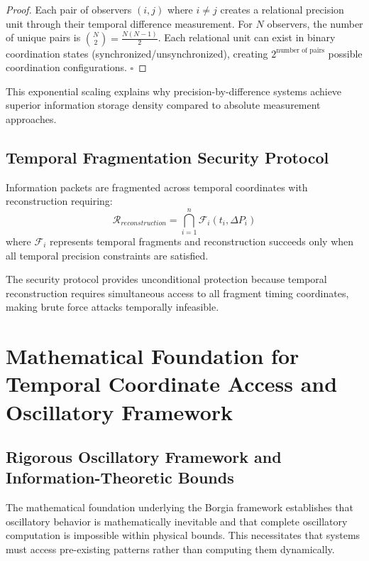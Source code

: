 \documentclass[11pt,a4paper]{article}
\begin{document}
\begin{proof}
Each pair of observers $(i,j)$ where $i \neq j$ creates a relational precision unit through their temporal difference measurement. For $N$ observers, the number of unique pairs is $\binom{N}{2} = \frac{N(N-1)}{2}$. Each relational unit can exist in binary coordination states (synchronized/unsynchronized), creating $2^{\text{number of pairs}}$ possible coordination configurations. $\square$
\end{proof}

This exponential scaling explains why precision-by-difference systems achieve superior information storage density compared to absolute measurement approaches.

\subsection{Temporal Fragmentation Security Protocol}

\begin{definition}
Information packets are fragmented across temporal coordinates with reconstruction requiring:
\begin{equation}
\mathcal{R}_{reconstruction} = \bigcap_{i=1}^{n} \mathcal{F}_i(t_i, \Delta P_i)
\end{equation}
where $\mathcal{F}_i$ represents temporal fragments and reconstruction succeeds only when all temporal precision constraints are satisfied.
\end{definition}

The security protocol provides unconditional protection because temporal reconstruction requires simultaneous access to all fragment timing coordinates, making brute force attacks temporally infeasible.

\section{Mathematical Foundation for Temporal Coordinate Access and Oscillatory Framework}

\subsection{Rigorous Oscillatory Framework and Information-Theoretic Bounds}

The mathematical foundation underlying the Borgia framework establishes that oscillatory behavior is mathematically inevitable and that complete oscillatory computation is impossible within physical bounds. This necessitates that systems must access pre-existing patterns rather than computing them dynamically.
\end{document}
